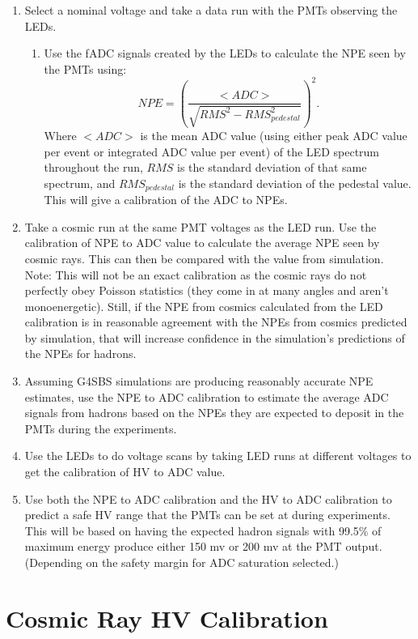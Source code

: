 \documentclass[10pt]{article}
\begin{document}
\begin{enumerate}
	\item Select a nominal voltage and take a data run with the PMTs observing the LEDs.
		\begin{enumerate}
			\item Use the fADC signals created by the LEDs to calculate the NPE seen by the PMTs using:
			\begin{equation}
				NPE = \left( \frac{<ADC>}{\sqrt{RMS^2-RMS_{pedestal}^2}} \right)^2.
			\end{equation}
			Where $<ADC>$ is the mean ADC value (using either peak ADC value per event or integrated ADC value per event) of the LED spectrum throughout the run, $RMS$ is the standard deviation of that same spectrum, and $RMS_{pedestal}$ is the standard deviation of the pedestal value. This will give a calibration of the ADC to NPEs.
		\end{enumerate}
		\item Take a cosmic run at the same PMT voltages as the LED run. Use the calibration of NPE to ADC value to calculate the average NPE seen by cosmic rays. This can then be compared with the value from simulation. Note: This will not be an exact calibration as the cosmic rays do not perfectly obey Poisson statistics (they come in at many angles and aren't monoenergetic). Still, if the NPE from cosmics calculated from the LED calibration is in reasonable agreement with the NPEs from cosmics predicted by simulation, that will increase confidence in the simulation's predictions of the NPEs for hadrons.
		\item Assuming G4SBS simulations are producing reasonably accurate NPE estimates, use the NPE to ADC calibration to estimate the average ADC signals from hadrons based on the NPEs they are expected to deposit in the PMTs during the experiments.
		\item Use the LEDs to do voltage scans by taking LED runs at different voltages to get the calibration of HV to ADC value.
		\item Use both the NPE to ADC calibration and the HV to ADC calibration to predict a safe HV range that the PMTs can be set at during experiments. This will be based on having the expected hadron signals with 99.5\% of maximum energy produce either 150 mv or 200 mv at the PMT output. (Depending on the safety margin for ADC saturation selected.)
\end{enumerate}

\section{Cosmic Ray HV Calibration}
\label{cosmic_hv}
\end{document}
